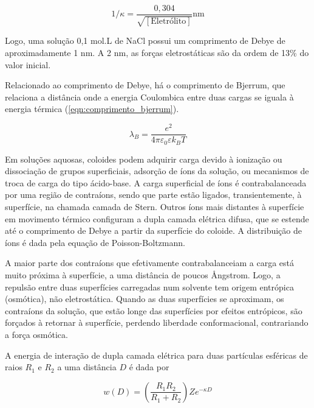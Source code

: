 	\begin{equation}
		1/\kappa = \dfrac{0{,}304}{\sqrt{\left[ \mathrm{Eletrólito} \right] }} \textrm{nm}
		\label{eqn:comprimento_debye}
	\end{equation} 
	
	Logo, uma solução 0,1 mol.L\menosUm{} de NaCl possui um comprimento de Debye de aproximadamente 1 nm. A 2 nm, as forças eletrostáticas são da ordem de 13\% do valor inicial.
	
	Relacionado ao comprimento de Debye, há o comprimento de Bjerrum, que relaciona a distância onde a energia Coulombica entre duas cargas se iguala à energia térmica (\autoref{eqn:comprimento_bjerrum}).
	
	\begin{equation}
		\lambda_B = \dfrac{e^2}{4 \pi \varepsilon_{ 0 } \varepsilon k_BT}
		\label{eqn:comprimento_bjerrum}
	\end{equation} 
	
	Em soluções aquosas, coloides podem adquirir carga devido à ionização ou dissociação de grupos superficiais, adsorção de íons da solução, ou mecanismos de troca de carga do tipo ácido-base. A carga superficial de íons é contrabalanceada por uma região de contraíons, sendo que parte estão ligados, transientemente, à superfície, na chamada camada de Stern.  Outros íons mais distantes à superfície em movimento térmico configuram a dupla camada elétrica difusa, que se estende até o comprimento de Debye a partir da superfície do coloide. A distribuição de íons é dada pela equação de Poisson-Boltzmann.
	
	A maior parte dos contraíons que efetivamente contrabalanceiam a carga está muito próxima à superfície, a uma distância de poucos \AA ngstrom. Logo, a repulsão entre duas superfícies carregadas num solvente tem origem entrópica (osmótica), não eletrostática. Quando as duas superfícies se aproximam, os contraíons da solução, que estão longe das superfícies por efeitos entrópicos, são forçados à retornar à superfície, perdendo liberdade conformacional, contrariando a força osmótica.
	
	A energia de interação de dupla camada elétrica para duas partículas esféricas de raios \(R_1\) e \(R_2\) a uma distância \(D\) é dada por
	
	\begin{equation}
		w(D) = \left(  \dfrac{R_1R_2}{R_1+R_2}  \right)Ze^{-\kappa D}
		\label{eqn:dupla_camada_esferas}
	\end{equation} 
	
